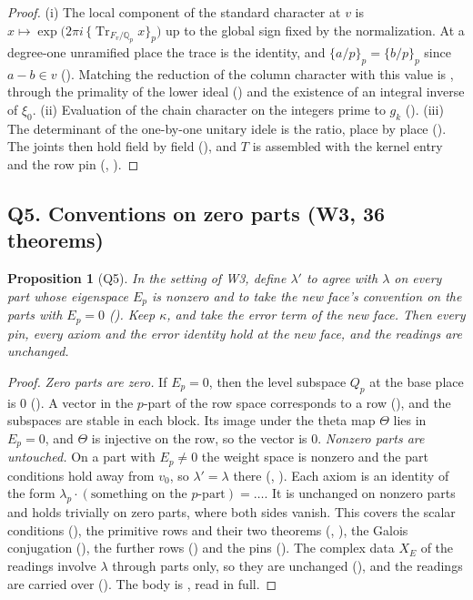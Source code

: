 \documentclass[11pt]{article}
\newcommand{\Tr}{\operatorname{Tr}}
\newtheorem{proposition}[theorem]{Proposition}
\theoremstyle{remark}
\begin{document}
\begin{proof}
(i) The local component of the standard character at $v$ is $x\mapsto\exp\bigl(2\pi i\,\{\Tr_{F_v/\mathbb Q_p}x\}_p\bigr)$ up to the global sign fixed by the normalization. At a degree-one unramified place the trace is the identity, and $\{a/p\}_p=\{b/p\}_p$ since $a-b\in v$ (). Matching the reduction of the column character with this value is , through the primality of the lower ideal () and the existence of an integral inverse of $\xi_0$. (ii) Evaluation of the chain character on the integers prime to $g_k$ (). (iii) The determinant of the one-by-one unitary idele is the ratio, place by place (). The joints then hold field by field (), and $T$ is assembled with the kernel entry and the row pin (, ).
\end{proof}

\subsection{Q5. Conventions on zero parts (W3, 36 theorems)}

\begin{proposition}[Q5]\label{prop:Q5}
In the setting of W3, define $\lambda'$ to agree with $\lambda$ on every part whose eigenspace $E_p$ is nonzero and to take the new face's convention on the parts with $E_p=0$ (). Keep $\kappa$, and take the error term of the new face. Then every pin, every axiom and the error identity hold at the new face, and the readings are unchanged.
\end{proposition}

\begin{proof}
\emph{Zero parts are zero.} If $E_p=0$, then the level subspace $Q_p$ at the base place is $0$ (). A vector in the $p$-part of the row space corresponds to a row (), and the subspaces are stable in each block. Its image under the theta map $\Theta$ lies in $E_p=0$, and $\Theta$ is injective on the row, so the vector is $0$. \emph{Nonzero parts are untouched.} On a part with $E_p\neq0$ the weight space is nonzero and the part conditions hold away from $v_0$, so $\lambda'=\lambda$ there (, ). Each axiom is an identity of the form $\lambda_p\cdot(\text{something on the }p\text{-part})=\ldots$. It is unchanged on nonzero parts and holds trivially on zero parts, where both sides vanish. This covers the scalar conditions (), the primitive rows and their two theorems (, ), the Galois conjugation (), the further rows () and the pins (). The complex data $X_E$ of the readings involve $\lambda$ through parts only, so they are unchanged (), and the readings are carried over (). The body is , read in full.
\end{proof}
\end{document}
